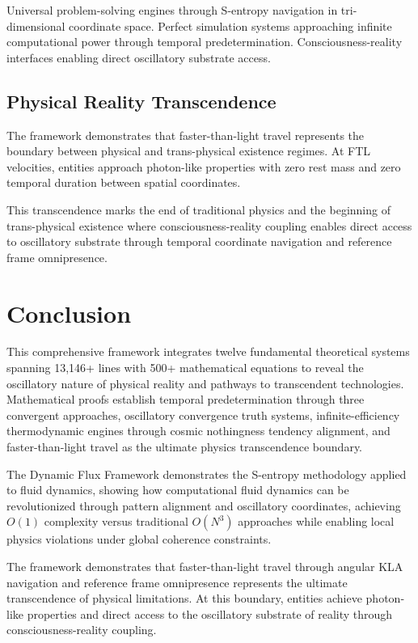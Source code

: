 \documentclass[12pt,a4paper]{article}
\begin{document}
Universal problem-solving engines through S-entropy navigation in tri-dimensional coordinate space. Perfect simulation systems approaching infinite computational power through temporal predetermination. Consciousness-reality interfaces enabling direct oscillatory substrate access.

\subsection{Physical Reality Transcendence}

The framework demonstrates that faster-than-light travel represents the boundary between physical and trans-physical existence regimes. At FTL velocities, entities approach photon-like properties with zero rest mass and zero temporal duration between spatial coordinates.

This transcendence marks the end of traditional physics and the beginning of trans-physical existence where consciousness-reality coupling enables direct access to oscillatory substrate through temporal coordinate navigation and reference frame omnipresence.

\section{Conclusion}

This comprehensive framework integrates twelve fundamental theoretical systems spanning 13,146+ lines with 500+ mathematical equations to reveal the oscillatory nature of physical reality and pathways to transcendent technologies. Mathematical proofs establish temporal predetermination through three convergent approaches, oscillatory convergence truth systems, infinite-efficiency thermodynamic engines through cosmic nothingness tendency alignment, and faster-than-light travel as the ultimate physics transcendence boundary.

The Dynamic Flux Framework demonstrates the S-entropy methodology applied to fluid dynamics, showing how computational fluid dynamics can be revolutionized through pattern alignment and oscillatory coordinates, achieving $O(1)$ complexity versus traditional $O(N^3)$ approaches while enabling local physics violations under global coherence constraints.

The framework demonstrates that faster-than-light travel through angular KLA navigation and reference frame omnipresence represents the ultimate transcendence of physical limitations. At this boundary, entities achieve photon-like properties and direct access to the oscillatory substrate of reality through consciousness-reality coupling.
\end{document}
